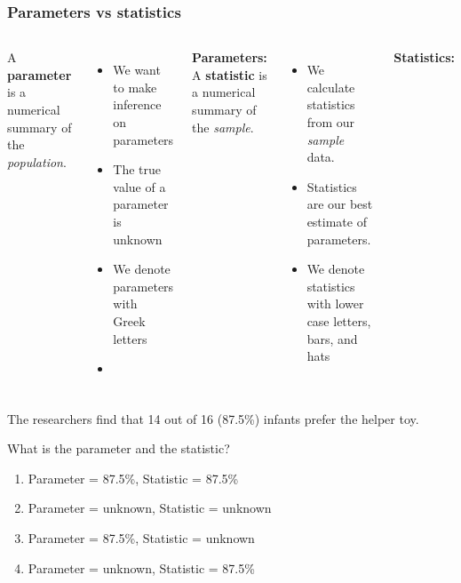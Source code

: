 \begin{frame}
\frametitle{Parameters vs statistics}
\begin{columns}
A \textbf{parameter} is a numerical summary of the \emph{population}.
    \begin{itemize}
        \item
        We want to make inference on parameters
        \item
        The true value of a parameter is unknown
        \item
        We denote parameters with Greek letters
        \item[]
    \end{itemize}
\vskip10pt
\textbf{Parameters:}\\
 A \textbf{statistic} is a numerical summary of the \emph{sample}.
    \begin{itemize}
        \item
        We calculate statistics from our \emph{sample} data.
        \item
        Statistics are our best estimate of parameters.
        \item
        We denote statistics with lower case letters, bars, and hats
    \end{itemize}
\vskip10pt
\textbf{Statistics:}\\
\end{columns}
\end{frame}

\begin{frame}
\frametitle{\grp}
The researchers find that 14 out of 16 (87.5\%) infants prefer the helper toy.
\begin{clicker}{What is the parameter and the statistic?}
\begin{enumerate}
    \item
    Parameter = 87.5\%, Statistic = 87.5\%
    \item
    Parameter = unknown, Statistic = unknown
    \item
    Parameter = 87.5\%, Statistic = unknown
    \item
    Parameter = unknown, Statistic = 87.5\%
    \end{enumerate}
\end{clicker}
\end{frame}


